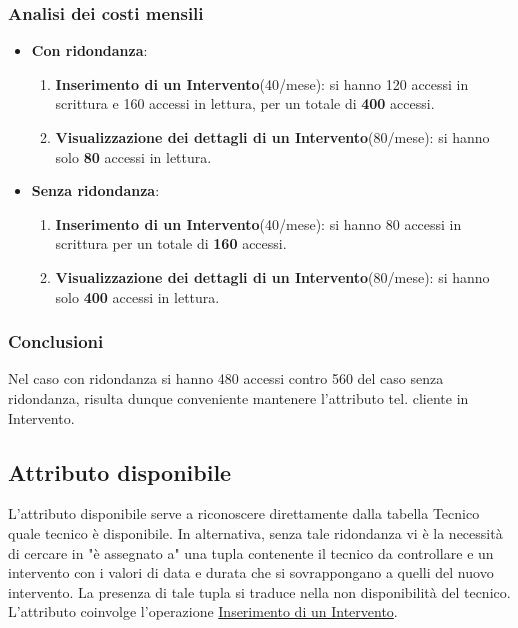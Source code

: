 \documentclass{article}
\begin{document}
\subsubsection{Analisi dei costi mensili}

\begin{itemize}
    \item \textbf{Con ridondanza}:
    \begin{enumerate}
        \item \textbf{Inserimento di un Intervento}(40/mese): si hanno 120 accessi in scrittura e 160 accessi in lettura, per un totale di \textbf{400} accessi.
        \item \textbf{Visualizzazione dei dettagli di un Intervento}(80/mese): si hanno solo \textbf{80} accessi in lettura.
    \end{enumerate}
    \newpage
    \item \textbf{Senza ridondanza}:
    \begin{enumerate}
        \item \textbf{Inserimento di un Intervento}(40/mese): si hanno 80 accessi in scrittura per un totale di \textbf{160} accessi.
        \item \textbf{Visualizzazione dei dettagli di un Intervento}(80/mese): si hanno solo \textbf{400} accessi in lettura.
    \end{enumerate}
\end{itemize}

\subsubsection{Conclusioni}

Nel caso con ridondanza si hanno 480 accessi contro 560 del caso senza ridondanza, risulta dunque conveniente mantenere l'attributo tel. cliente in Intervento.

\subsection{Attributo disponibile}

L'attributo disponibile serve a riconoscere direttamente dalla tabella Tecnico quale tecnico è disponibile. In alternativa, senza tale ridondanza vi è la necessità di cercare in "è assegnato a" una tupla contenente il tecnico da controllare e un intervento con i valori di data e durata che si sovrappongano a quelli del nuovo intervento. La presenza di tale tupla si traduce nella non disponibilità del tecnico. L'attributo coinvolge l'operazione \underline{Inserimento di un Intervento}.
\end{document}
